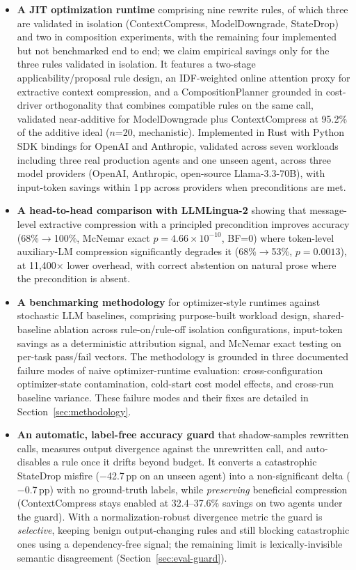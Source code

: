 \documentclass[sigconf,9pt]{acmart}
\begin{document}
\begin{itemize}
\item \textbf{A JIT optimization runtime} comprising nine rewrite rules, of which
three are validated in isolation (ContextCompress, ModelDowngrade, StateDrop) and two
in composition experiments, with the remaining four implemented but not benchmarked
end to end; we claim empirical savings only for the three rules validated in isolation.
It features a two-stage
applicability/proposal rule design, an IDF-weighted online attention proxy for
extractive context compression, and a CompositionPlanner grounded in cost-driver
orthogonality that combines compatible rules on the same call, validated near-additive
for ModelDowngrade plus ContextCompress at 95.2\% of the additive ideal ($n$=20,
mechanistic). Implemented in Rust with Python SDK bindings for OpenAI and Anthropic,
validated across seven workloads including three real production agents and one unseen
agent, across three model providers (OpenAI, Anthropic, open-source Llama-3.3-70B),
with input-token savings within 1\,pp across providers when preconditions are met.

\item \textbf{A head-to-head comparison with LLMLingua-2} showing that message-level
extractive compression with a principled precondition improves accuracy
(68\%$\rightarrow$100\%, McNemar exact $p=4.66\times10^{-10}$, BF=0) where
token-level auxiliary-LM compression significantly degrades it
(68\%$\rightarrow$53\%, $p=0.0013$), at 11{,}400$\times$ lower overhead, with
correct abstention on natural prose where the precondition is absent.

\item \textbf{A benchmarking methodology} for optimizer-style runtimes against
stochastic LLM baselines, comprising purpose-built workload design, shared-baseline
ablation across rule-on/rule-off isolation configurations, input-token savings as a
deterministic attribution signal, and McNemar exact testing on per-task pass/fail
vectors. The methodology is grounded in three documented failure modes of naive
optimizer-runtime evaluation: cross-configuration optimizer-state contamination,
cold-start cost model effects, and cross-run baseline variance. These failure modes
and their fixes are detailed in Section~\ref{sec:methodology}.

\item \textbf{An automatic, label-free accuracy guard} that shadow-samples rewritten
calls, measures output divergence against the unrewritten call, and auto-disables a
rule once it drifts beyond budget. It converts a catastrophic StateDrop misfire
($-$42.7\,pp on an unseen agent) into a non-significant delta ($-$0.7\,pp) with no
ground-truth labels, while \textit{preserving} beneficial compression (ContextCompress
stays enabled at 32.4--37.6\% savings on two agents under the guard). With a
normalization-robust divergence metric the guard is \textit{selective}, keeping benign
output-changing rules and still blocking catastrophic ones using a dependency-free signal;
the remaining limit is lexically-invisible semantic disagreement
(Section~\ref{sec:eval-guard}).
\end{itemize}
\end{document}
